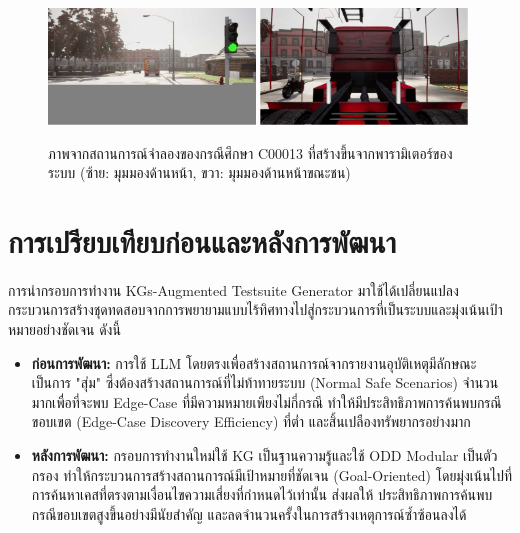 \begin{figure}[htbp]
    \centering
    \includegraphics[width=0.49\textwidth]{images/c00013_sim_front}
    \includegraphics[width=0.49\textwidth]{images/c00013_sim_front_col}
    \caption{ภาพจากสถานการณ์จำลองของกรณีศึกษา C00013 ที่สร้างขึ้นจากพารามิเตอร์ของระบบ (ซ้าย: มุมมองด้านหน้า, ขวา: มุมมองด้านหน้าขณะชน)}
    \label{fig:c00013_simulation}
\end{figure}

\section{การเปรียบเทียบก่อนและหลังการพัฒนา}
\paragraph{}
การนำกรอบการทำงาน KGs-Augmented Testsuite Generator มาใช้ได้เปลี่ยนแปลงกระบวนการสร้างชุดทดสอบจากการพยายามแบบไร้ทิศทางไปสู่กระบวนการที่เป็นระบบและมุ่งเน้นเป้าหมายอย่างชัดเจน ดังนี้

\begin{itemize}
    \item \textbf{ก่อนการพัฒนา:} การใช้ LLM โดยตรงเพื่อสร้างสถานการณ์จากรายงานอุบัติเหตุมีลักษณะเป็นการ "สุ่ม" ซึ่งต้องสร้างสถานการณ์ที่ไม่ท้าทายระบบ (Normal Safe Scenarios) จำนวนมากเพื่อที่จะพบ Edge-Case ที่มีความหมายเพียงไม่กี่กรณี ทำให้มีประสิทธิภาพการค้นพบกรณีขอบเขต (Edge-Case Discovery Efficiency) ที่ต่ำ และสิ้นเปลืองทรัพยากรอย่างมาก

    \item \textbf{หลังการพัฒนา:} กรอบการทำงานใหม่ใช้ KG เป็นฐานความรู้และใช้ ODD Modular เป็นตัวกรอง ทำให้กระบวนการสร้างสถานการณ์มีเป้าหมายที่ชัดเจน (Goal-Oriented) โดยมุ่งเน้นไปที่การค้นหาเคสที่ตรงตามเงื่อนไขความเสี่ยงที่กำหนดไว้เท่านั้น ส่งผลให้ ประสิทธิภาพการค้นพบกรณีขอบเขตสูงขึ้นอย่างมีนัยสำคัญ และลดจำนวนครั้งในการสร้างเหตุการณ์ซ้ำซ้อนลงได้
\end{itemize}

